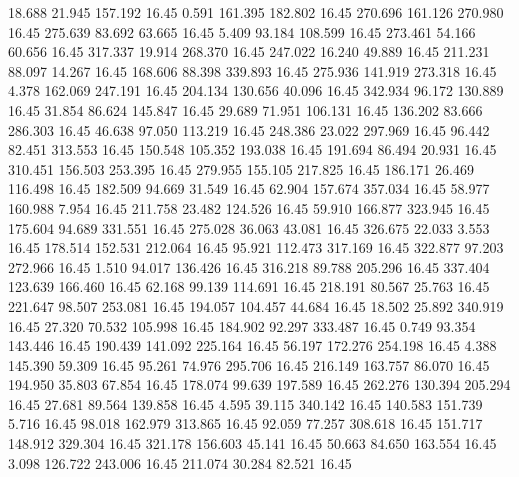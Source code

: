   18.688   21.945  157.192        16.45
   0.591  161.395  182.802        16.45
 270.696  161.126  270.980        16.45
 275.639   83.692   63.665        16.45
   5.409   93.184  108.599        16.45
 273.461   54.166   60.656        16.45
 317.337   19.914  268.370        16.45
 247.022   16.240   49.889        16.45
 211.231   88.097   14.267        16.45
 168.606   88.398  339.893        16.45
 275.936  141.919  273.318        16.45
   4.378  162.069  247.191        16.45
 204.134  130.656   40.096        16.45
 342.934   96.172  130.889        16.45
  31.854   86.624  145.847        16.45
  29.689   71.951  106.131        16.45
 136.202   83.666  286.303        16.45
  46.638   97.050  113.219        16.45
 248.386   23.022  297.969        16.45
  96.442   82.451  313.553        16.45
 150.548  105.352  193.038        16.45
 191.694   86.494   20.931        16.45
 310.451  156.503  253.395        16.45
 279.955  155.105  217.825        16.45
 186.171   26.469  116.498        16.45
 182.509   94.669   31.549        16.45
  62.904  157.674  357.034        16.45
  58.977  160.988    7.954        16.45
 211.758   23.482  124.526        16.45
  59.910  166.877  323.945        16.45
 175.604   94.689  331.551        16.45
 275.028   36.063   43.081        16.45
 326.675   22.033    3.553        16.45
 178.514  152.531  212.064        16.45
  95.921  112.473  317.169        16.45
 322.877   97.203  272.966        16.45
   1.510   94.017  136.426        16.45
 316.218   89.788  205.296        16.45
 337.404  123.639  166.460        16.45
  62.168   99.139  114.691        16.45
 218.191   80.567   25.763        16.45
 221.647   98.507  253.081        16.45
 194.057  104.457   44.684        16.45
  18.502   25.892  340.919        16.45
  27.320   70.532  105.998        16.45
 184.902   92.297  333.487        16.45
   0.749   93.354  143.446        16.45
 190.439  141.092  225.164        16.45
  56.197  172.276  254.198        16.45
   4.388  145.390   59.309        16.45
  95.261   74.976  295.706        16.45
 216.149  163.757   86.070        16.45
 194.950   35.803   67.854        16.45
 178.074   99.639  197.589        16.45
 262.276  130.394  205.294        16.45
  27.681   89.564  139.858        16.45
   4.595   39.115  340.142        16.45
 140.583  151.739    5.716        16.45
  98.018  162.979  313.865        16.45
  92.059   77.257  308.618        16.45
 151.717  148.912  329.304        16.45
 321.178  156.603   45.141        16.45
  50.663   84.650  163.554        16.45
   3.098  126.722  243.006        16.45
 211.074   30.284   82.521        16.45
